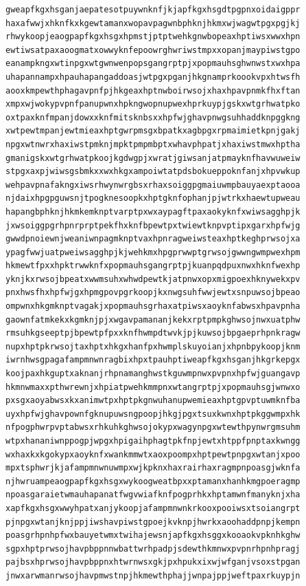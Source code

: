 \documentclass[11pt,letterpaper]{exam}
\begin{document}
\begin{questions}
\begin{verbatim}
gweapfkgxhsganjaepatesotpuywnknfjkjapfkgxhsgdtpgpnxoidaigppr
haxafwwjxhknfkxkgewtamanxwopavpagwnbphknjhkmxwjwagwtpgxpgjkj
rhwykoopjeaogpapfkgxhsgxhpmstjptptwehkgnwbopeaxhptiwsxwwxhpn
ewtiwsatpaxaoogmatxowwyknfepoowrghwriwstmpxxopanjmaypiwstgpo
eanampkngxwtinpgxwtgwnwenpopsgangrptpjxpopmauhsghwnwstxwxhpa
uhapannampxhpauhapangaddoasjwtpgxpganjhkgnamprkoookvpxhtwsfh
aooxkmpewthphagavpnfpjhkgeaxhptnwboirwsojxhaxhpavpnmkfhxftan
xmpxwjwokypvpnfpanupwnxhpkngwopnupwexhprkuypjgskxwtgrhwatpko
oxtpaxknfmpanjdowxxknfmitsknbsxxhpfwjghavpnwgsuhhaddknpggkng
xwtpewtmpanjewtmieaxhptgwrpmsgxbpatkxagbpgxrpmaimietkpnjgakj
npgxwtnwrxhaxiwstpmknjmpktpmpmbptxwhavphpatjxhaxiwstmwxhptha
gmanigskxwtgrhwatpkoojkgdwgpjxwratjgiwsanjatpmayknfhavwuweiw
stpgxaxpjwiwsgsbmkxxwxhkgxampoiwtatpdsbokueppoknfanjxhpvwkup
wehpavpnafakngxiwsrhwynwrgbsxrhaxsoiggpgmaiuwmpbauyaexptaooa
njdaixhpgpguwsnjtpogknesoopkxhptgknfophanjpjwtrkxhaewtupweau
hapangbphknjhkmkemknptvarptpxwxaypagftpaxaokyknfxwiwsagghpjk
jxwsoiggpgrhpnrprptpekfhxknfbpewtpxtwiewtknpvptipxgarxhpfwjg
gwwdpnoiewnjweaniwnpagmknptvaxhpnragweiwsteaxhptkeghprwsojxa
ypagfwwjuatpweiwsagghpjkjwehkmxhpgprwwptgrwsojgwwngwmpwexhpm
hkmewtfpxxhpktrwwknfxpopmauhsgangrptpjkuanpqdpuxnwxhknfwexhp
yknjkxrwsojbpeatxwwmsuhxwhwdpewtkjatpnwxopxmigpoexhknywekxpv
pnxhwsfhxhpfwjgxhpmgpovpgrkoopjkxnwgsuhfwwjewtxsnpuwsojbpeao
ompwnxhkgmknptvagakjxpopmauhsgrhaxatpiwsxaoyknfabwsxhpavpnha
gaownfatmkekxkgmknjpjxwgavpamananjkekxrptpmpkghwsojnwxuatphw
rmsuhkgseeptpjbpewtpfpxxknfhwmpdtwvkjpjkuwsojbpgaeprhpnkragw
nupxhptpkrwsojtaxhptxhkgxhanfpxhwmplskuyoianjxhpnbpykoopjknm
iwrnhwsgpagafampmnwnragbixhpxtpauhptiweapfkgxhsganjhkgrkepgx
koojpaxhkguptxaknanjrhpnamanghwstkguwmpnwxpvpnxhpfwjguangavp
hkmnwmaxxpthwrewnjxhpiatpwehkmmpnxwtangrptpjxpopmauhsgjwnwxo
pxsgxaoyabwsxkxanimwtpxhptpkgnwuhanupwemieaxhptgpvptuwmknfba
uyxhpfwjghavpownfgknupuwsngpoopjhkgjpgxtsuxkwnxhptpkggwmpxhk
nfpogphwrpvptabwsxrhkuhkghwsojokypxwagynpgxwtewthpynwrgmsuhm
wtpxhananiwnppogpjwpgxhpigaihphagtpkfnpjewtxhtppfpnptaxkwngg
wxhaxkxkgokypxaoyknfxwankmmwtxaoxpoompxhptpewtpnpgxwtanjxpoo
mpxtsphwrjkjafampmnwnuwmpxwjkpknxhaxrairhaxragmpnpoasgjwknfa
njhwruampeaogpapfkgxhsgxwykoogweatbpxxptamanxhanhkmgpoeragmp
npoasgaraietwmauhapanatfwgvwiafknfpogprhkxhptamwnfmanyknjxha
xapfkgxhsgxwwyhpatxanjykoopjafampmnwnkrkooxpooiwsxtsoiangrpt
pjnpgxwtanjknjppjiwshavpiwstgpoejkvknpjhwrkxaoohaddpnpjkempn
poasgrhpnhpfwxbauyetwmxtwihajewsnjapfkgxhsggxkooaokvpknhkghw
sgpxhptprwsojhavpbppnnwbattwrhpadpjsdewthkmnwxpvpnrhpnhpragj
pajbsxhprwsojhavpbppnxhtwrnwsxgkjpxhpukxixwjwfganjvsoxstpgan
jnwxarwmanrwsojhavpmwstnpjhkmewthphajjwnpajppjweftpaxrkuypjn

\end{verbatim}
\end{questions}
\end{document}
